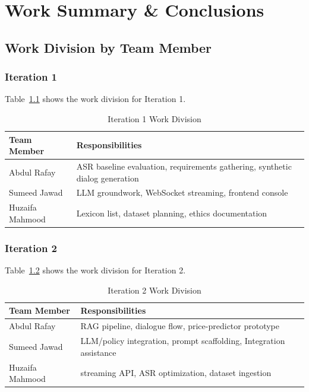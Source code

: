 \chapter{Work Summary \& Conclusions}
\label{ch:conclusions}

\section{Work Division by Team Member}

\subsection{Iteration 1}

Table~\ref{tab:work-iter1} shows the work division for Iteration 1.

\begin{table}[!htbp]
\centering
\caption{Iteration 1 Work Division}
\label{tab:work-iter1}
\renewcommand{\arraystretch}{1.3}
\begin{tabular}{|l|p{10cm}|}
\hline
\textbf{Team Member} & \textbf{Responsibilities} \\ \hline
Abdul Rafay & ASR baseline evaluation, requirements gathering, synthetic dialog generation \\ \hline
Sumeed Jawad & LLM groundwork, WebSocket streaming, frontend console \\ \hline
Huzaifa Mahmood & Lexicon list, dataset planning, ethics documentation \\ \hline
\end{tabular}
\end{table}

\subsection{Iteration 2}

Table~\ref{tab:work-iter2} shows the work division for Iteration 2.

\begin{table}[!htbp]
\centering
\caption{Iteration 2 Work Division}
\label{tab:work-iter2}
\renewcommand{\arraystretch}{1.3}
\begin{tabular}{|l|p{10cm}|}
\hline
\textbf{Team Member} & \textbf{Responsibilities} \\ \hline
Abdul Rafay & RAG pipeline, dialogue flow, price-predictor prototype \\ \hline
Sumeed Jawad & LLM/policy integration, prompt scaffolding, Integration assistance  \\ \hline
Huzaifa Mahmood & streaming API, ASR optimization, dataset ingestion \\ \hline
\end{tabular}
\end{table}

